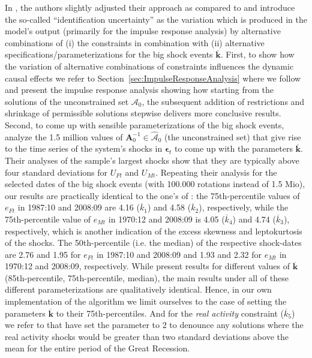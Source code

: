 \documentclass[a4paper,11pt,listof=nochaptergap,oneside,pointednumbers,bibtotoc,bigheadings,liststotoc,hidelinks]{scrbook}
\theoremstyle{mysatz}
\theoremstyle{mydefinition}
\theoremstyle{mytheorem}
\theoremstyle{mybemerkung}
\let\oldhat\hat
\newcommand{\vect}[1]{\boldsymbol{\mathbf{#1}}}
\newcommand{\hatt}[1]{\oldhat{\boldsymbol{\mathbf{#1}}}}
\begin{document}
In \citet{ludvigsonetal:19}, the authors slightly adjusted their approach as compared to \citet{ludvigsonetal:18} and introduce the so-called ``identification uncertainty'' as the variation which is produced in the model's output (primarily for the impulse response analysis) by alternative combinations of (i) the constraints in combination with (ii) alternative specifications/parameterizations for the big shock events $\overline{\vect{k}}$. First, to show how the variation of alternative combinations of constraints influences the dynamic causal effects we refer to Section~\ref{sec:ImpulseResponseAnalysis} where we follow \citet{ludvigsonetal:19} and present the impulse response analysis showing how starting from the solutions of the unconstrained set $\vect{\mathcal{A}}_0$, the subsequent addition of restrictions and shrinkage of permissible solutions stepwise delivers more conclusive results. Second, to come up with sensible parameterizations of the big shock events, \citet{ludvigsonetal:19} analyze the 1.5 million values of $\vect{A}_0^{-1} \in \hatt{\mathcal{A}}_0$ (the unconstrained set) that give rise to the time series of the system's shocks in $\vect{\epsilon}_t$ to come up with the parameters $\overline{\vect{k}}$. Their analyses of the sample's largest shocks show that they are typically above four standard deviations for $U_{Ft}$ and $U_{Mt}$. Repeating their analysis for the selected dates of the big shock events (with 100.000 rotations instead of 1.5 Mio), our results are practically identical to the one's of \citet{ludvigsonetal:19}: the 75th-percentile values of $e_{Ft}$ in 1987:10 and 2008:09 are 4.16 ($\overline{k}_1$) and 4.58 ($\overline{k}_2$), respectively, while the 75th-percentile value of $e_{Mt}$ in 1970:12 and 2008:09 is 4.05 ($\overline{k}_4$) and 4.74 ($\overline{k}_3$), respectively, which is another indication of the excess skewness and leptokurtosis of the shocks. The 50th-percentile (i.e. the median) of the respective shock-dates are 2.76 and 1.95 for $e_{Ft}$ in 1987:10 and 2008:09 and 1.93 and 2.32 for $e_{Mt}$ in 1970:12 and 2008:09, respectively. While \citet{ludvigsonetal:19} present results for different values of $\overline{\vect{k}}$ (85th-percentile, 75th-percentile, median), the main results under all of these different parameterizations are qualitatively identical. Hence, in our own implementation of the algorithm we limit ourselves to the case of setting the parameters $\overline{\vect{k}}$ to their 75th-percentiles. And for the \textit{real activity} constraint ($\overline{k}_5$) we refer to \citet{ludvigsonetal:18} that have set the parameter to 2 to denounce any solutions where the real activity shocks would be greater than two standard deviations above the mean for the entire period of the Great Recession.
\end{document}
